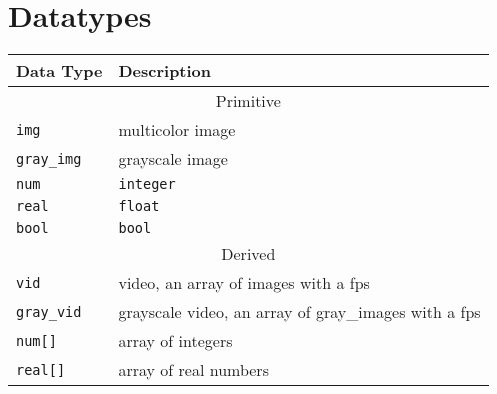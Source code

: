 \documentclass[a4paper, 11pt]{article}
\begin{document}
\section{Datatypes}
\begin{tabular}{ |p{3cm}|p{10cm}|  }
  \hline
  Data Type & Description\\
  \hline
  \multicolumn{2}{|c|}{Primitive} \\
  \hline
  \texttt{img} & multicolor image \\
  \texttt{gray\_img} & grayscale image \\
  \texttt{num} & \texttt{integer}\\
  \texttt{real} & \texttt{float}\\
  \texttt{bool} & \texttt{bool}\\
  \hline
  \multicolumn{2}{|c|}{Derived} \\
  \hline
  \texttt{vid} & video, an array of images with a fps\\
  \texttt{gray\_vid} & grayscale video, an array of gray\_images with a fps\\
  \texttt{num[]} & array of integers\\
  \texttt{real[]} & array of real numbers\\
  \hline
 \end{tabular}
\end{document}
